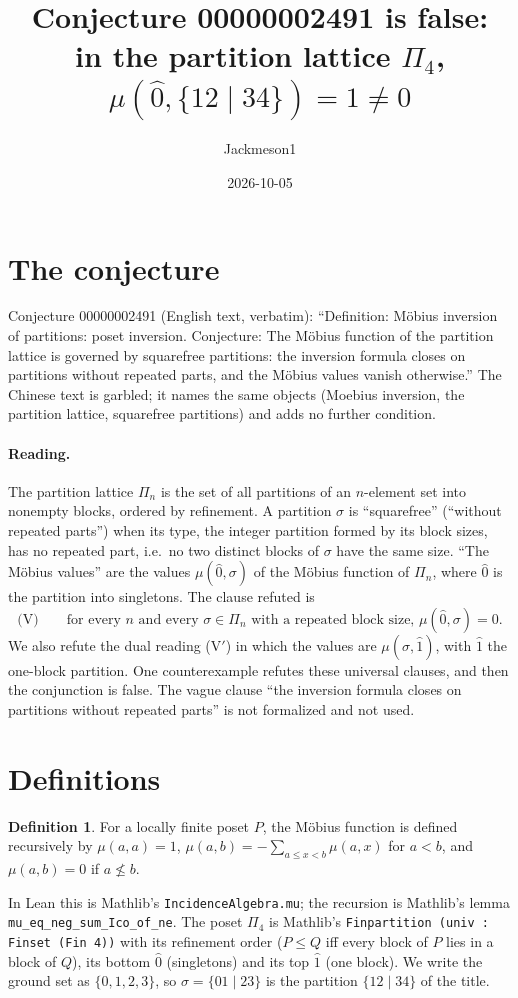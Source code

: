\documentclass[11pt]{article}
\title{Conjecture 00000002491 is false:\\ in the partition lattice $\Pi_4$, $\mu(\hat 0,\{12\mid34\})=1\neq0$}
\author{Jackmeson1}
\date{2026-10-05}
\theoremstyle{definition}
\newtheorem{definition}[theorem]{Definition}
\begin{document}
\maketitle

\section{The conjecture}
Conjecture 00000002491 (English text, verbatim): ``Definition: M\"obius inversion of partitions:
poset inversion. Conjecture: The M\"obius function of the partition lattice is governed by
squarefree partitions: the inversion formula closes on partitions without repeated parts, and the
M\"obius values vanish otherwise.'' The Chinese text is garbled; it names the same objects (Moebius inversion,
the partition lattice, squarefree partitions) and adds no further condition.

\paragraph{Reading.} The partition lattice $\Pi_n$ is the set of all partitions of an $n$-element
set into nonempty blocks, ordered by refinement. A partition $\sigma$ is ``squarefree'' (``without
repeated parts'') when its type, the integer partition formed by its block sizes, has no repeated
part, i.e.\ no two distinct blocks of $\sigma$ have the same size. ``The M\"obius values'' are the
values $\mu(\hat0,\sigma)$ of the M\"obius function of $\Pi_n$, where $\hat0$ is the partition into
singletons. The clause refuted is
\[
\text{(V)}\qquad \text{for every } n \text{ and every } \sigma\in\Pi_n \text{ with a repeated block size, } \mu(\hat0,\sigma)=0 .
\]
We also refute the dual reading (V$'$) in which the values are $\mu(\sigma,\hat1)$, with $\hat1$
the one-block partition. One counterexample refutes these universal clauses, and then the
conjunction is false. The vague clause ``the inversion formula closes on partitions without
repeated parts'' is not formalized and not used.

\section{Definitions}
\begin{definition}
For a locally finite poset $P$, the M\"obius function is defined recursively by
$\mu(a,a)=1$, $\mu(a,b)=-\sum_{a\le x<b}\mu(a,x)$ for $a<b$, and $\mu(a,b)=0$ if
$a\not\le b$.
\end{definition}
In Lean this is Mathlib's \texttt{IncidenceAlgebra.mu}; the recursion is Mathlib's lemma
\texttt{mu\_eq\_neg\_sum\_Ico\_of\_ne}. The poset $\Pi_4$ is Mathlib's
\texttt{Finpartition (univ : Finset (Fin 4))} with its refinement order ($P\le Q$ iff every block
of $P$ lies in a block of $Q$), its bottom $\hat 0$ (singletons) and its top $\hat1$ (one block).
We write the ground set as $\{0,1,2,3\}$, so $\sigma=\{01\mid23\}$ is the partition $\{12\mid34\}$
of the title.
\end{document}
